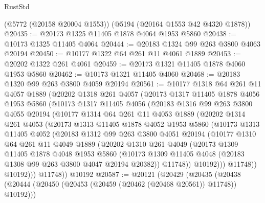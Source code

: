 \begin{lexlean}{RustStd}
\begin{coremodule}
    (@5772 (@20158 @20004 @1553))
    (@5194 (@20164 @1553 @42 @4320 @1878))
@20435 := @20173 @1325 @11405 @1878 @4064 @1953 @5860
@20438 := @10173 @1325 @11405 @4064
@20444 := @20183 @1324 @99 @263 @3800 @4063 @20194
@20450 := @10177 @1322 @64 @261 @11 @4061 @1889
@20453 := @20202 @1322 @261 @4061
@20459 := @20173 @1321 @11405 @1878 @4060 @1953 @5860
@20462 := @10173 @1321 @11405 @4060
@20468 := @20183 @1320 @99 @263 @3800 @4059 @20194
@20561 := @10177
    @1318
    @64
    @261
    @11
    @4057
    @1889
    (@20202
      @1318
      @261
      @4057
      (@20173
        @1317
        @11405
        @1878
        @4056
        @1953
        @5860
        (@10173
          @1317
          @11405
          @4056
          (@20183
            @1316
            @99
            @263
            @3800
            @4055
            @20194
            (@10177
              @1314
              @64
              @261
              @11
              @4053
              @1889
              (@20202
                @1314
                @261
                @4053
                (@20173
                  @1313
                  @11405
                  @1878
                  @4052
                  @1953
                  @5860
                  (@10173
                    @1313
                    @11405
                    @4052
                    (@20183
                      @1312
                      @99
                      @263
                      @3800
                      @4051
                      @20194
                      (@10177
                        @1310
                        @64
                        @261
                        @11
                        @4049
                        @1889
                        (@20202
                          @1310
                          @261
                          @4049
                          (@20173
                            @1309
                            @11405
                            @1878
                            @4048
                            @1953
                            @5860
                            (@10173
                              @1309
                              @11405
                              @4048
                              (@20183 @1308 @99 @263 @3800 @4047 @20194 @20382))
                            @11748))
                        @10192)))
                  @11748))
              @10192)))
        @11748))
    @10192
@20587 := @20121
    (@20429
      (@20435
        (@20438 (@20444 (@20450 (@20453 (@20459 (@20462 (@20468 @20561)) @11748)) @10192)))

\end{coremodule}
\end{lexlean}
